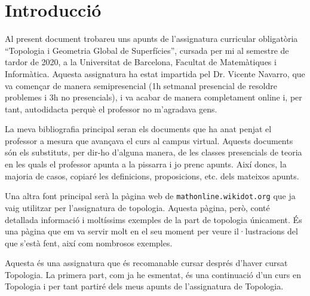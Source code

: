 \documentclass[../main.tex]{subfiles}
\begin{document}
\chapter*{Introducció}

Al present document trobareu uns apunts de l'assignatura curricular obligatòria ``Topologia i Geometria Global de Superfícies'', cursada per mi al semestre de tardor de 2020, a la Universitat de Barcelona, Facultat de Matemàtiques i Informàtica. Aquesta assignatura ha estat impartida pel Dr. Vicente Navarro, que va començar de manera semipresencial (1h setmanal presencial de resoldre problemes i 3h no presencials), i va acabar de manera completament online i, per tant, autodidacta perquè el professor no m'agradava gens.

La meva bibliografia principal seran els documents que ha anat penjat el professor a mesura que avançava el curs al campus virtual. Aquests documents són els substituts, per dir-ho d'alguna manera, de les classes presencials de teoria en les quals el professor apunta a la pissarra i jo prenc apunts. Així doncs, la majoria de casos, copiaré les definicions, proposicions, etc. dels mateixos apunts. 

Una altra font principal serà la pàgina web de  \texttt{mathonline.wikidot.org} \cite{mathonline} que ja vaig utilitzar per l'assignatura de topologia. Aquesta pàgina, però, conté detallada informació i moltíssims exemples de la part de topologia únicament. És una pàgina que em va servir molt en el seu moment per veure il·lustracions del que s'està fent, així com nombrosos exemples.

Aquesta és una assignatura que és recomanable cursar després d'haver cursat Topologia. La primera part, com ja he esmentat, és una continuació d'un curs en Topologia i per tant partiré dels meus apunts de l'assignatura de Topologia.






\end{document}
